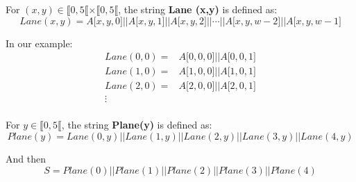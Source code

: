 \begin{defn}
For $(x,y) \in \llbracket 0,5 \llbracket \times \llbracket 0,5 \llbracket$, the string \textbf{Lane (x,y)} is defined as:
$$Lane (x, y) = A\lbrack x, y, 0\rbrack \vert \vert A\lbrack x, y, 1\rbrack \vert \vert A\lbrack x, y, 2\rbrack \vert \vert \cdots \vert \vert A\lbrack x, y, w-2\rbrack \vert \vert A\lbrack x, y, w-1\rbrack $$
\end{defn}
In our example:
\begin{equation}
\begin{aligned}
Lane (0, 0) =& A\lbrack 0, 0, 0\rbrack \vert \vert A\lbrack 0, 0, 1\rbrack \\
Lane (1, 0) =& A\lbrack 1, 0, 0\rbrack \vert \vert A\lbrack 1, 0, 1\rbrack \\
Lane (2, 0) =& A\lbrack 2, 0, 0\rbrack \vert \vert A\lbrack 2, 0, 1\rbrack \\
\vdots & \\
\end{aligned}
\end{equation}

\begin{defn}
For $ y \in \llbracket 0,5 \llbracket$, the string \textbf{Plane(y)} is defined as:
$$Plane (y) = Lane (0,y) \vert \vert Lane (1,y) \vert \vert Lane (2,y) \vert \vert Lane (3,y) \vert \vert Lane (4,y) $$
\end{defn}
And then
$$S= Plane (0) \vert \vert  Plane (1) \vert \vert Plane (2) \vert \vert  Plane (3) \vert \vert  Plane (4) $$

